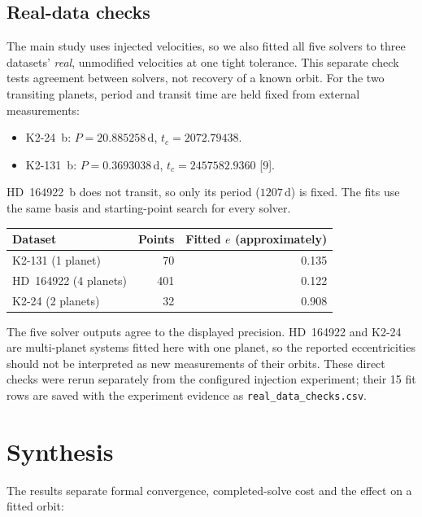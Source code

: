 \documentclass[11pt,a4paper]{article}
\begin{document}
\subsection{Real-data checks}

The main study uses injected velocities, so we also fitted all five
solvers to three datasets' \emph{real}, unmodified velocities at
one tight tolerance. This separate check tests agreement between
solvers, not recovery of a known orbit. For the two transiting planets,
period and transit time are held fixed from external measurements:
\begin{itemize}
  \item K2-24~b: $P = 20.885258$\,d, $t_c = 2072.79438$.
  \item K2-131~b: $P = 0.3693038$\,d, $t_c = 2457582.9360$ [9].
\end{itemize}
HD~164922~b does not transit, so only its period ($1207$\,d) is fixed.
The fits use the same basis and starting-point search for every solver.

\begin{center}
\small
\begin{tabular}{@{}lrr@{}}
\toprule
\textbf{Dataset} & \textbf{Points} & \textbf{Fitted $e$ (approximately)} \\
\midrule
K2-131 (1 planet)    & 70  & 0.135 \\
HD~164922 (4 planets) & 401 & 0.122 \\
K2-24 (2 planets)    & 32  & 0.908 \\
\bottomrule
\end{tabular}
\end{center}

The five solver outputs agree to the displayed precision. HD~164922 and
K2-24 are multi-planet systems fitted here with one planet, so the
reported eccentricities should not be interpreted as new measurements
of their orbits. These direct checks were rerun separately from the
configured injection experiment; their 15 fit rows are saved with the
experiment evidence as \texttt{real\_data\_checks.csv}.

\FloatBarrier
\section{Synthesis}

The results separate formal convergence, completed-solve cost and the
effect on a fitted orbit:
\end{document}
